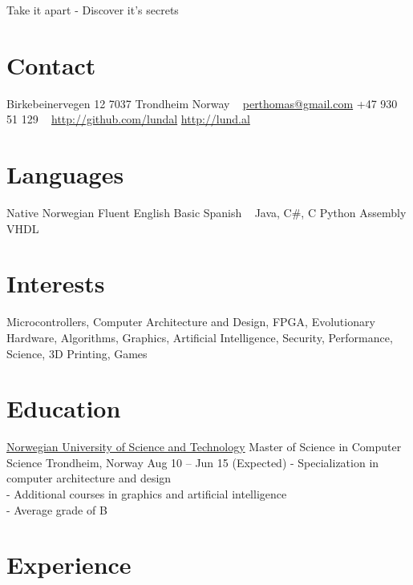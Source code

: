 \documentclass[print]{friggeri-cv}
\begin{document}
       {Take it apart - Discover it's secrets}


\begin{aside}
    \section{Contact}
        Birkebeinervegen 12
        7037 Trondheim
        Norway
        ~
        \href{mailto:perthomas@gmail.com}{perthomas@gmail.com}
        +47 930 51 129
        ~
        \href{http://github.com/lundal}{http://github.com/lundal}
        \href{http://lund.al}{http://lund.al}
    \section{Languages}
        Native Norwegian
        Fluent English
        Basic Spanish
        ~
        Java, C\#, C
        Python
        Assembly
        VHDL
\end{aside}

\section{Interests}

Microcontrollers,
Computer Architecture and Design,
FPGA,
Evolutionary Hardware,
Algorithms,
Graphics,
Artificial Intelligence,
Security,
Performance,
Science,
3D Printing,
Games

\section{Education}

\begin{entrylist}
    \entryx
        {\href{http://ntnu.no/}{Norwegian University of Science and Technology}}
        {Master of Science in Computer Science}
        {Trondheim, Norway}
        {Aug 10 – Jun 15 (Expected)}
        {- Specialization in computer architecture and design\\
         - Additional courses in graphics and artificial intelligence\\
         - Average grade of B}
\end{entrylist}

\section{Experience}
\end{document}
